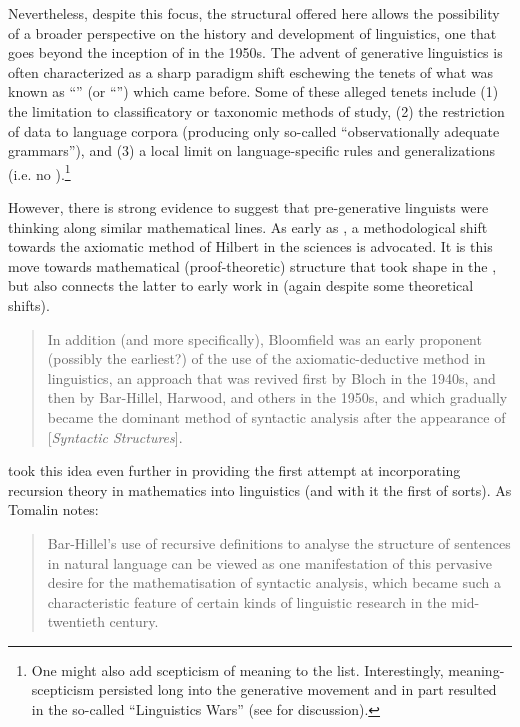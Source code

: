 \documentclass[output=paper]{langscibook}
\begin{document}
Nevertheless, despite this focus, the structural  offered here allows the possibility of a broader perspective on the history and development of linguistics, one that goes beyond the inception of  in the 1950s. The advent of generative linguistics is often characterized as a sharp par\-a\-digm shift eschewing the tenets of what was known as ``'' (or ``'') which came before. Some of these alleged tenets include (1) the limitation to classificatory or taxonomic methods of study, (2) the restriction of data to language corpora (producing only so-called ``observationally adequate grammars''), and (3) a local limit on language-specific rules and generalizations (i.e. no ).\footnote{One might also add scepticism of meaning to the list. Interestingly, meaning-scepticism persisted long into the generative movement and in part resulted in the so-called ``Linguistics Wars'' (see \citealt{Newmeyer1996} for discussion).}

However, there is strong evidence to suggest that pre-generative linguists were thinking along similar mathematical lines. As early as \cite{Bloomfield1926}, a meth\-od\-o\-logical shift towards the axiomatic method of Hilbert in the sciences is advocated. It is this move towards mathematical (proof-theoretic) structure that took shape in the , but also connects the latter to early work in  (again despite some theoretical shifts).

\begin{quote}
    In addition (and more specifically), Bloomfield was an early proponent (possibly the earliest?) of the use of the axiomatic-deductive method in linguistics, an approach that was revived first by Bloch in the 1940s, and then by Bar-Hillel, Harwood, and others in the 1950s, and which gradually became the dominant method of syntactic analysis after the appearance of [\emph{Syntactic Structures}]. \citep[184]{Tomalin2006}
\end{quote}


\cite{Bar-Hillel1953} took this idea even further in providing the first attempt at incorporating recursion theory in mathematics into linguistics (and with it the first  of sorts). As Tomalin notes:

\begin{quote}
    Bar-Hillel's use of recursive definitions to analyse the structure of sentences in natural language can be viewed as one manifestation of this pervasive desire for the mathematisation of syntactic analysis, which became such a characteristic feature of certain kinds of linguistic research in the mid-twentieth century. \citep[67]{Tomalin2006}
\end{quote}
\end{document}
